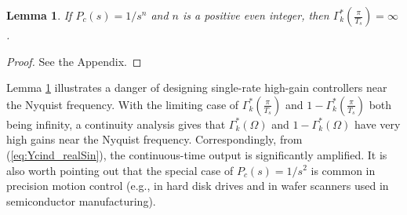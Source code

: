 \documentclass [11pt, proquest] {uwthesis}[2020/02/24]
\newtheorem{lemma}{Lemma}
\begin{document}
\begin{lemma}\label{If--and}If $P_{c}(s)=1/s^{n}$ and $n$ is a
positive even integer, then $\Gamma_{k}^{*}(\frac{\pi}{T_{s}})=\infty$.\end{lemma}
\begin{proof}
See the Appendix.
\end{proof}
Lemma \ref{If--and} illustrates a danger of designing single-rate
high-gain controllers near the Nyquist frequency. With the limiting
case of $\Gamma_{k}^{*}(\frac{\pi}{T_{s}})$ and $1-\Gamma_{k}^{*}(\frac{\pi}{T_{s}})$
both being infinity, a continuity analysis gives that $\Gamma_{k}^{*}(\Omega)$
and $1-\Gamma_{k}^{*}(\Omega)$ have very high gains near the Nyquist
frequency. Correspondingly, from (\ref{eq:Ycind_realSin}), the continuous-time
output is significantly amplified. It is also worth pointing out that
the special case of $P_{c}(s)=1/s^{2}$ is common in precision motion
control (e.g., in hard disk drives \cite{AlMamun2007} and in wafer
scanners used in semiconductor manufacturing).
\end{document}
